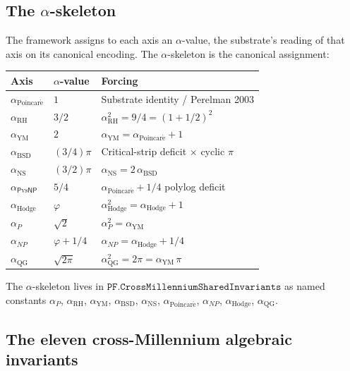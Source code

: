 \documentclass[11pt,a4paper]{article}
\theoremstyle{plain}
\theoremstyle{definition}
\begin{document}
\subsection{The $\alpha$-skeleton}
\label{sec:alpha-skeleton}

The framework assigns to each axis an $\alpha$-value, the
substrate's reading of that axis on its canonical encoding. The
$\alpha$-skeleton is the canonical assignment:

\begin{center}
\renewcommand{\arraystretch}{1.20}
\begin{tabular}{lll}
\toprule
\textbf{Axis} & \textbf{$\alpha$-value} & \textbf{Forcing} \\
\midrule
$\alpha_{\mathrm{Poincar\acute e}}$ & $1$ &
  Substrate identity / Perelman 2003 \\
$\alpha_{\mathrm{RH}}$ & $3/2$ &
  $\alpha_{\mathrm{RH}}^{2} = 9/4 = (1 + 1/2)^{2}$ \\
$\alpha_{\mathrm{YM}}$ & $2$ &
  $\alpha_{\mathrm{YM}} = \alpha_{\mathrm{Poincar\acute e}} + 1$ \\
$\alpha_{\mathrm{BSD}}$ & $(3/4)\pi$ &
  Critical-strip deficit $\times$ cyclic $\pi$ \\
$\alpha_{\mathrm{NS}}$ & $(3/2)\pi$ &
  $\alpha_{\mathrm{NS}} = 2\,\alpha_{\mathrm{BSD}}$ \\
$\alpha_{\mathsf{P}\mathrm{vs}\mathsf{NP}}$ & $5/4$ &
  $\alpha_{\mathrm{Poincar\acute e}} + 1/4$ polylog deficit \\
$\alpha_{\mathrm{Hodge}}$ & $\varphi$ &
  $\alpha_{\mathrm{Hodge}}^{2} = \alpha_{\mathrm{Hodge}} + 1$ \\
$\alpha_{P}$ & $\sqrt{2}$ &
  $\alpha_{P}^{2} = \alpha_{\mathrm{YM}}$ \\
$\alpha_{NP}$ & $\varphi + 1/4$ &
  $\alpha_{NP} = \alpha_{\mathrm{Hodge}} + 1/4$ \\
$\alpha_{\mathrm{QG}}$ & $\sqrt{2\pi}$ &
  $\alpha_{\mathrm{QG}}^{2} = 2\pi = \alpha_{\mathrm{YM}}\,\pi$ \\
\bottomrule
\end{tabular}
\end{center}

The $\alpha$-skeleton lives in
$\mathtt{PF.CrossMillenniumSharedInvariants}$ as named constants
$\alpha_{P}$, $\alpha_{\mathrm{RH}}$, $\alpha_{\mathrm{YM}}$,
$\alpha_{\mathrm{BSD}}$, $\alpha_{\mathrm{NS}}$,
$\alpha_{\mathrm{Poincar\acute e}}$, $\alpha_{NP}$,
$\alpha_{\mathrm{Hodge}}$, $\alpha_{\mathrm{QG}}$.

\subsection{The eleven cross-Millennium algebraic invariants}
\label{sec:invariants}
\end{document}
